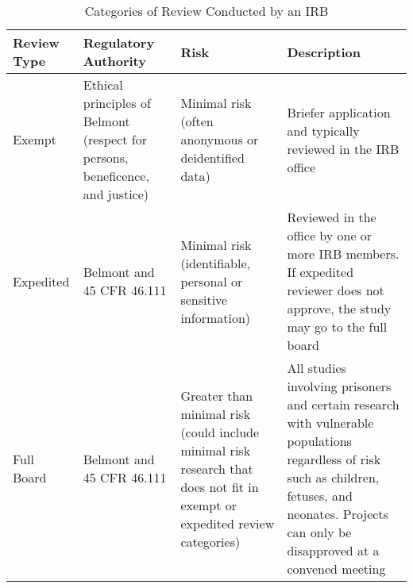 \begin{table}

\caption{\label{tab:}Categories of Review Conducted by an IRB}
\centering
\begin{tabular}[t]{l|l|l|l}
\hline
Review Type & Regulatory Authority & Risk & Description\\
\hline
Exempt & Ethical principles of Belmont (respect for persons, beneficence, and justice) & Minimal risk (often anonymous or deidentified data) & Briefer application and typically reviewed in the IRB office\\
\hline
Expedited & Belmont and 45 CFR 46.111 & Minimal risk (identifiable, personal or sensitive information) & Reviewed in the office by one or more IRB members. If expedited reviewer does not approve, the study may go to the full board\\
\hline
Full Board & Belmont and 45 CFR 46.111 & Greater than minimal risk (could include minimal risk research that does not fit in exempt or expedited review categories) & All studies involving prisoners and certain research with vulnerable populations regardless of risk such as children, fetuses, and neonates. Projects can only be disapproved at a convened meeting\\
\hline
\end{tabular}
\end{table}